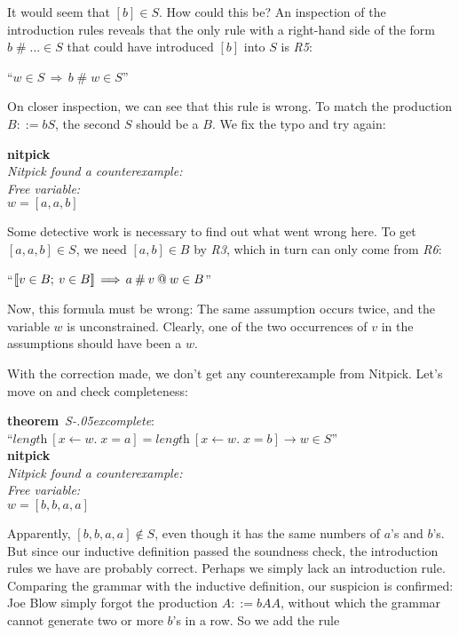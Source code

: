 \documentclass[a4paper,12pt]{article}
\renewcommand\_{\hbox{\textunderscore\kern-.05ex}}
\begin{document}
It would seem that $[b] \in S$. How could this be? An inspection of the
introduction rules reveals that the only rule with a right-hand side of the form
$b \mathbin{\#} {\ldots} \in S$ that could have introduced $[b]$ into $S$ is
\textit{R5}:

\prew
``$w \in S\,\Longrightarrow\, b \mathbin{\#} w \in S$''
\postw

On closer inspection, we can see that this rule is wrong. To match the
production $B ::= bS$, the second $S$ should be a $B$. We fix the typo and try
again:

\prew
\textbf{nitpick} \\[2\smallskipamount]
\slshape Nitpick found a counterexample: \\[2\smallskipamount]
\hbox{}\qquad Free variable: \nopagebreak \\
\hbox{}\qquad\qquad $w = [a, a, b]$
\postw

Some detective work is necessary to find out what went wrong here. To get $[a,
a, b] \in S$, we need $[a, b] \in B$ by \textit{R3}, which in turn can only come
from \textit{R6}:

\prew
``$\mathopen{[\![} v \in B;\> v \in B\mathclose{]\!]} \,\Longrightarrow\, a \mathbin{\#} v \mathbin{@} w \in B$''
\postw

Now, this formula must be wrong: The same assumption occurs twice, and the
variable $w$ is unconstrained. Clearly, one of the two occurrences of $v$ in
the assumptions should have been a $w$.

With the correction made, we don't get any counterexample from Nitpick. Let's
move on and check completeness:

\prew
\textbf{theorem}~\textit{S\_complete}: \\
``$\textit{length}~[x\mathbin{\leftarrow} w.\; x = a] =
   \textit{length}~[x\mathbin{\leftarrow} w.\; x = b]
  \longrightarrow w \in S$'' \\
\textbf{nitpick} \\[2\smallskipamount]
\slshape Nitpick found a counterexample: \\[2\smallskipamount]
\hbox{}\qquad Free variable: \nopagebreak \\
\hbox{}\qquad\qquad $w = [b, b, a, a]$
\postw

Apparently, $[b, b, a, a] \notin S$, even though it has the same numbers of
$a$'s and $b$'s. But since our inductive definition passed the soundness check,
the introduction rules we have are probably correct. Perhaps we simply lack an
introduction rule. Comparing the grammar with the inductive definition, our
suspicion is confirmed: Joe Blow simply forgot the production $A ::= bAA$,
without which the grammar cannot generate two or more $b$'s in a row. So we add
the rule
\end{document}
